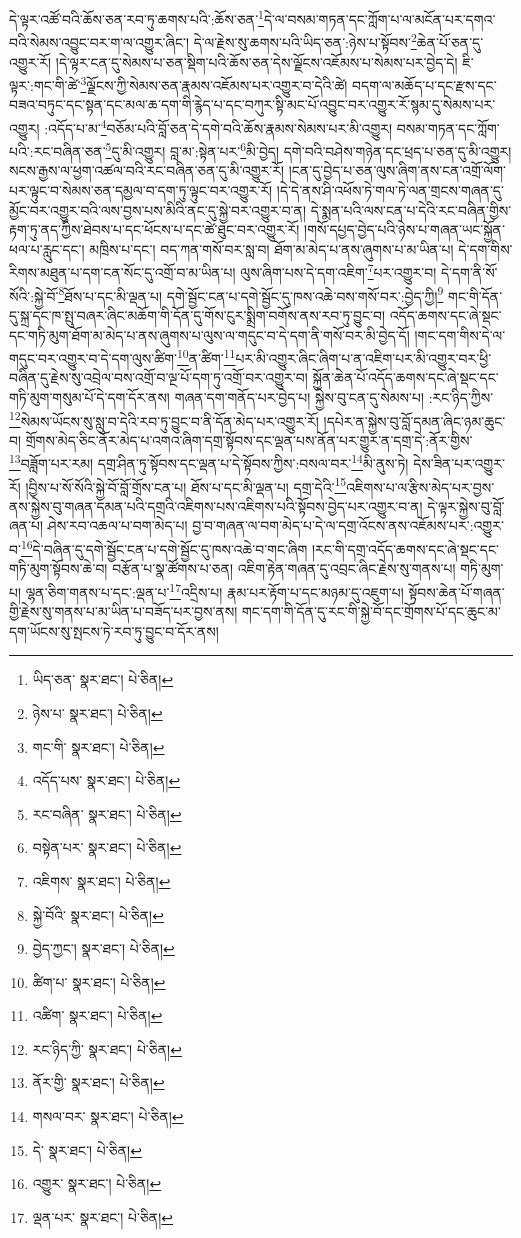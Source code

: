 དེ་ལྟར་འཚོ་བའི་ཆོས་ཅན་རབ་ཏུ་ཆགས་པའི་:ཆོས་ཅན་\footnote{ཡིད་ཅན་  སྣར་ཐང་།  པེ་ཅིན། }དེ་ལ་བསམ་གཏན་དང་ཀློག་པ་ལ་མངོན་པར་དགའ་བའི་སེམས་འབྱུང་བར་ག་ལ་འགྱུར་ཞིང་། དེ་ལ་རྗེས་སུ་ཆགས་པའི་ཡིད་ཅན་:ཉེས་པ་སྟོབས་\footnote{ཉེས་པ་  སྣར་ཐང་།  པེ་ཅིན། }ཆེན་པོ་ཅན་དུ་འགྱུར་རོ། །དེ་ལྟར་ངན་དུ་སེམས་པ་ཅན་སྡིག་པའི་ཆོས་ཅན་དེས་ལྗོངས་འཇོམས་པ་སེམས་པར་བྱེད་དེ། ཇི་ལྟར་:གང་གི་ཚེ་\footnote{གང་གི་  སྣར་ཐང་།  པེ་ཅིན། }ལྗོངས་ཀྱི་སེམས་ཅན་རྣམས་འཇོམས་པར་འགྱུར་བ་དེའི་ཚེ། བདག་ལ་མཆོད་པ་དང་རྫས་དང་བཟའ་བཏུང་དང་སྟན་དང་མལ་ཆ་དག་གི་རྙེད་པ་དང་བཀུར་སྟི་མང་པོ་འབྱུང་བར་འགྱུར་རོ་སྙམ་དུ་སེམས་པར་འགྱུར། :འདོད་པ་མ་\footnote{འདོད་པས་  སྣར་ཐང་།  པེ་ཅིན། }བཅོམ་པའི་བློ་ཅན་དེ་དགེ་བའི་ཆོས་རྣམས་སེམས་པར་མི་འགྱུར། བསམ་གཏན་དང་ཀློག་པའི་:རང་བཞིན་ཅན་\footnote{རང་བཞིན་  སྣར་ཐང་།  པེ་ཅིན། }དུ་མི་འགྱུར། བླ་མ་:སྟེན་པར་\footnote{བསྟེན་པར་  སྣར་ཐང་།  པེ་ཅིན། }མི་བྱེད། དགེ་བའི་བཤེས་གཉེན་དང་ཕྲད་པ་ཅན་དུ་མི་འགྱུར། སངས་རྒྱས་ལ་ཕྱག་འཚལ་བའི་རང་བཞིན་ཅན་དུ་མི་འགྱུར་རོ། །ངན་དུ་བྱེད་པ་ཅན་ལུས་ཞིག་ནས་ངན་འགྲོ་ལོག་པར་ལྟུང་བ་སེམས་ཅན་དམྱལ་བ་དག་ཏུ་ལྟུང་བར་འགྱུར་རོ། །དེ་དེ་ནས་ཤི་འཕོས་ཏེ་གལ་ཏེ་ལན་གྲངས་གཞན་དུ་མྱོང་བར་འགྱུར་བའི་ལས་བྱས་པས་མིའི་ནང་དུ་སྐྱེ་བར་འགྱུར་བ་ན། དེ་སྨན་པའི་ལས་ངན་པ་དེའི་རང་བཞིན་གྱིས་རྟག་ཏུ་ནད་ཀྱིས་ཐེབས་པ་དང་ཕོངས་པ་དང་ཚེ་ཐུང་བར་འགྱུར་རོ། །གསོ་དཔྱད་བྱེད་པའི་ཉེས་པ་གཞན་ཡང་སྐྱོན་ཕལ་པ་རླུང་དང་། མཁྲིས་པ་དང་། བད་ཀན་གསོ་བར་སླ་བ། ཐོག་མ་མེད་པ་ནས་ཞུགས་པ་མ་ཡིན་པ། དེ་དག་གིས་རིགས་མཐུན་པ་དག་ངན་སོང་དུ་འགྲོ་བ་མ་ཡིན་པ། ལུས་ཞིག་པས་དེ་དག་འཇིག་\footnote{འཇིགས་  སྣར་ཐང་།  པེ་ཅིན། }པར་འགྱུར་བ། དེ་དག་ནི་སོ་སོའི་:སྐྱེ་བོ་\footnote{སྐྱེ་བོའི་  སྣར་ཐང་།  པེ་ཅིན། }ཐོས་པ་དང་མི་ལྡན་པ། དགེ་སྦྱོང་ངན་པ་དགེ་སྦྱོང་དུ་ཁས་འཆེ་བས་གསོ་བར་:བྱེད་ཀྱི།\footnote{བྱེད་ཀྱང་།  སྣར་ཐང་།  པེ་ཅིན། } གང་གི་དོན་དུ་སྐྲ་དང་ཁ་སྤུ་བཞར་ཞིང་མཆོག་གི་དོན་དུ་གོས་ངུར་སྨྲིག་བགོས་ནས་རབ་ཏུ་བྱུང་བ། འདོད་ཆགས་དང་ཞེ་སྡང་དང་གཏི་མུག་ཐོག་མ་མེད་པ་ནས་ཞུགས་པ་ལུས་ལ་གདུང་བ་དེ་དག་ནི་གསོ་བར་མི་བྱེད་དོ། །གང་དག་གིས་དེ་ལ་གདུང་བར་འགྱུར་བ་དེ་དག་ལུས་ཚིག་\footnote{ཚིག་པ་  སྣར་ཐང་།  པེ་ཅིན། }ན་ཚིག་\footnote{འཚིག་  སྣར་ཐང་།  པེ་ཅིན། }པར་མི་འགྱུར་ཞིང་ཞིག་པ་ན་འཇིག་པར་མི་འགྱུར་བར་ཕྱི་བཞིན་དུ་རྗེས་སུ་འབྲེལ་བས་འགྲོ་བ་ལྔ་པོ་དག་ཏུ་འགྲོ་བར་འགྱུར་བ། སྐྱོན་ཆེན་པོ་འདོད་ཆགས་དང་ཞེ་སྡང་དང་གཏི་མུག་གསུམ་པོ་དེ་དག་དོར་ནས། གཞན་དག་གནོད་པར་བྱེད་པ། སྐྱེས་བུ་ངན་དུ་སེམས་པ། :རང་ཉིད་ཀྱིས་\footnote{རང་ཉིད་ཀྱི་  སྣར་ཐང་།  པེ་ཅིན། }སེམས་ཡོངས་སུ་སླུ་བ་དེའི་རབ་ཏུ་བྱུང་བ་ནི་དོན་མེད་པར་འགྱུར་རོ། །དཔེར་ན་སྐྱེས་བུ་བློ་དམན་ཞིང་ཉམ་ཆུང་བ། གྲོགས་མེད་ཅིང་ནོར་མེད་པ་འགའ་ཞིག་དགྲ་སྟོབས་དང་ལྡན་པས་ནོན་པར་གྱུར་ན་དགྲ་དེ་:ནོར་གྱིས་\footnote{ནོར་གྱི་  སྣར་ཐང་།  པེ་ཅིན། }བཟློག་པར་རམ། དགྲ་ཤིན་ཏུ་སྟོབས་དང་ལྡན་པ་དེ་སྟོབས་ཀྱིས་:བསལ་བར་\footnote{གསལ་བར་  སྣར་ཐང་།  པེ་ཅིན། }མི་ནུས་ཏེ། དེས་ཟིན་པར་འགྱུར་རོ། །བྱིས་པ་སོ་སོའི་སྐྱེ་བོ་བློ་གྲོས་ངན་པ། ཐོས་པ་དང་མི་ལྡན་པ། དགྲ་དེའི་\footnote{དེ་  སྣར་ཐང་།  པེ་ཅིན། }འཇིགས་པ་ལ་རྩིས་མེད་པར་བྱས་ནས་སྐྱེས་བུ་གཞན་དམན་པའི་དགྲའི་འཇིགས་པས་འཇིགས་པའི་སྟོབས་བྱེད་པར་འགྱུར་བ་ན། དེ་ལྟར་སྐྱེས་བུ་བློ་ཞན་པ། ཤེས་རབ་འཆལ་པ་བག་མེད་པ། བྱ་བ་གཞན་ལ་བག་མེད་པ་དེ་ལ་དགྲ་འོངས་ནས་འཇོམས་པར་:འགྱུར་བ་\footnote{འགྱུར་  སྣར་ཐང་།  པེ་ཅིན། }དེ་བཞིན་དུ་དགེ་སྦྱོང་ངན་པ་དགེ་སྦྱོང་དུ་ཁས་འཆེ་བ་གང་ཞིག །རང་གི་དགྲ་འདོད་ཆགས་དང་ཞེ་སྡང་དང་གཏི་མུག་སྟོབས་ཆེ་བ། བརྩོན་པ་སྣ་ཚོགས་པ་ཅན། འཇིག་རྟེན་གཞན་དུ་འབྲང་ཞིང་རྗེས་སུ་གནས་པ། གཏི་མུག་པ། ལྷན་ཅིག་གནས་པ་དང་:ལྡན་པ་\footnote{ལྡན་པར་  སྣར་ཐང་།  པེ་ཅིན། }འདྲིས་པ། རྣམ་པར་རྟོག་པ་དང་མཉམ་དུ་འཇུག་པ། སྟོབས་ཆེན་པོ་གཞན་གྱི་རྗེས་སུ་གནས་པ་མ་ཡིན་པ་བཟོད་པར་བྱས་ནས། གང་དག་གི་དོན་དུ་རང་གི་སྐྱེ་བོ་དང་གྲོགས་པོ་དང་ཆུང་མ་དག་ཡོངས་སུ་སྤངས་ཏེ་རབ་ཏུ་བྱུང་བ་དོར་ནས། 